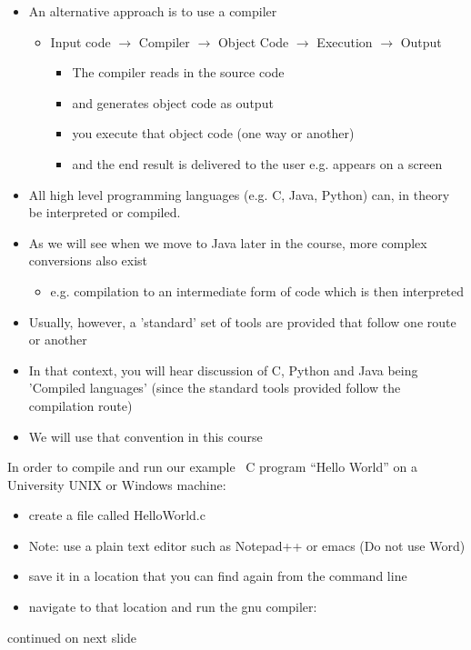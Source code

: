 \documentclass{beamer}
\begin{document}
\begin{frame}

\begin{itemize}
\item An alternative approach is to use a compiler

\begin{itemize}
\item Input code $\rightarrow $ Compiler $\rightarrow $ Object Code $\rightarrow $ Execution $\rightarrow $ Output
\begin{itemize}
\item The compiler reads in the source code
\item and generates object code as output
\item you execute that object code (one way or another)
\item and the end result is delivered to the user e.g. appears on a screen
\end{itemize}
\end{itemize}
\end{itemize}
\end{frame}

\begin{frame}
\begin{itemize}
\item All high level programming languages (e.g. C, Java, Python) can, in theory be interpreted or compiled.
\item As we will see when we move to Java later in the course, more complex conversions also exist 
\begin{itemize}
\item e.g. compilation to an intermediate form of code which is then interpreted
\end{itemize}
\item Usually, however, a 'standard' set of tools are provided that follow one route or another 
\item In that context, you will hear discussion of C, Python and Java being 'Compiled languages' (since the standard tools provided follow the compilation route)
\item We will use that convention in this course
\end{itemize}
\end{frame}

\begin{frame}
In order to compile and run our example \ C program ``Hello World'' on a University UNIX or Windows machine:
\begin{itemize}
\item create a file called HelloWorld.c
\item Note: use a plain text editor such as Notepad++ or emacs (Do not use Word)
\item save it in a location that you can find again from the command line
\item navigate to that location and run the gnu compiler:
\end{itemize}
continued on next slide
\end{frame}
\end{document}
